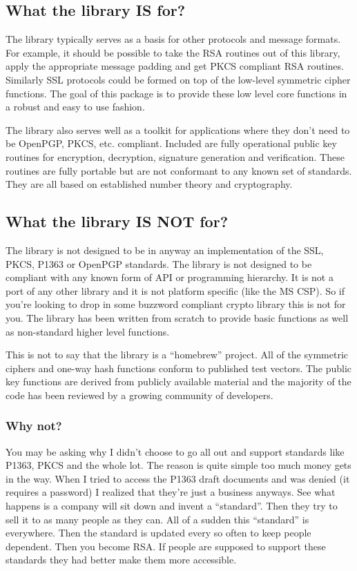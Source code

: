 \documentclass{book}
\begin{document}
\subsection{What the library IS for?}

The library typically serves as a basis for other protocols and message formats.  For example, it should be possible to 
take the RSA routines out of this library, apply the appropriate message padding and get PKCS compliant RSA routines.  
Similarly SSL protocols could be formed on top  of the low-level symmetric cipher functions.  The goal of this package is 
to provide these low level core functions in a robust and easy to use fashion.

The library also serves well as a toolkit for applications where they don't need to be OpenPGP, PKCS, etc. compliant.
Included are fully operational public key routines for encryption, decryption, signature generation and verification.  
These routines are fully portable but are not conformant to any known set of standards.  They are all based on established
number theory and cryptography.  

\subsection{What the library IS NOT for?}

The library is not designed to be in anyway an implementation of the SSL, PKCS, P1363 or OpenPGP standards.  The library 
is not designed to be compliant with any known form of API or programming hierarchy.  It is not a port of any other 
library and it is not platform specific (like the MS CSP).  So if you're looking to drop in some buzzword 
compliant crypto library this is not for you.  The library has been written from scratch to provide basic functions as 
well as non-standard higher level functions.  

This is not to say that the library is a ``homebrew'' project.  All of the symmetric ciphers and one-way hash functions
conform to published test vectors.  The public key functions are derived from publicly available material and the majority
of the code has been reviewed by a growing community of developers.

\subsubsection{Why not?}
You may be asking why I didn't choose to go all out and support standards like P1363, PKCS and the whole lot.  The reason
is quite simple too much money gets in the way.  When I tried to access the P1363 draft documents and was denied (it 
requires a password) I realized that they're just a business anyways.  See what happens is a company will sit down and
invent a ``standard''.  Then they try to sell it to as many people as they can.  All of a sudden this ``standard'' is 
everywhere.  Then the standard is updated every so often to keep people dependent.  Then you become RSA.  If people are 
supposed to support these standards they had better make them more accessible.
\end{document}
